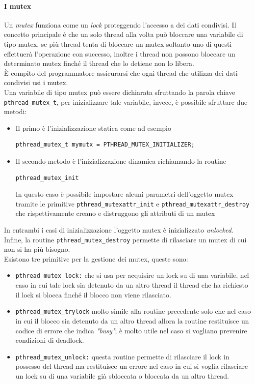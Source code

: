 \paragraph{I mutex}
Un \emph{mutex} funziona come un \emph{lock} proteggendo l'accesso a dei dati condivisi. Il concetto principale è che un solo thread alla volta può bloccare una variabile di tipo mutex, se più thread tenta di bloccare un mutex soltanto uno di questi effettuerà l'operazione con successo, inoltre i thread non possono bloccare un determinato mutex finché il thread che lo detiene non lo libera.\\
\uppercase{è} compito del programmatore assicurarsi che ogni thread che utilizza dei dati condivisi usi i mutex.\\
Una variabile di tipo mutex può essere dichiarata sfruttando la parola chiave \texttt{pthread\_mutex\_t}, per inizializzare tale variabile, invece, è possibile sfruttare due metodi:
\begin{itemize}
\item Il primo è l'inizializzazione statica come ad esempio
\begin{verbatim}
pthread_mutex_t mymutx = PTHREAD_MUTEX_INITIALIZER;
\end{verbatim}
\item Il secondo metodo è l'inizializzazione dinamica richiamando la routine
\begin{verbatim}
pthread_mutex_init
\end{verbatim}
In questo caso è possibile impostare alcuni parametri dell'oggetto mutex tramite le primitive \texttt{pthread\_mutexattr\_init} e \texttt{pthread\_mutexattr\_destroy} che rispettivamente creano e distruggono gli attributi  di un mutex
\end{itemize}
In entrambi i casi di inizializzazione l'oggetto mutex è inizializzato \emph{unlocked}. Infine, la routine \texttt{pthread\_mutex\_destroy} permette di rilasciare un mutex di cui non si ha più bisogno.\\
Esistono tre primitive per la gestione dei mutex, queste sono:
\begin{itemize}
\item \texttt{pthread\_mutex\_lock:} che si usa per acquisire un lock su di una variabile, nel caso in cui tale lock sia detenuto da un altro thread il thread che ha richiesto il lock si blocca finché il blocco non viene rilasciato.
\item \texttt{pthread\_mutex\_trylock} molto simile alla routine precedente solo che nel caso in cui il blocco sia detenuto da un altro thread allora la routine restituisce un codice di errore che indica \emph{"busy"}; è molto utile nel caso si vogliano prevenire condizioni di deadlock.
\item \texttt{pthread\_mutex\_unlock:} questa routine permette di rilasciare il lock in possesso del thread ma restituisce un errore nel caso in cui si voglia rilasciare un lock su di una variabile già sbloccata o bloccata da un altro thread.
\end{itemize}

